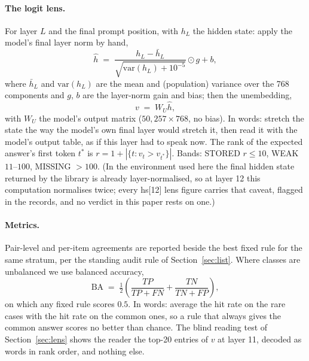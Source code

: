 \documentclass[11pt]{article}
\begin{document}
\paragraph{The logit lens.} For layer $L$ and the final prompt
position, with $h_L$ the hidden state: apply the model's final
layer norm by hand,
\begin{equation}
\hat{h} \;=\; \frac{h_L - \bar{h}_L}{\sqrt{\mathrm{var}(h_L) + 10^{-5}}}
\odot g + b,
\label{eq:lensnorm}
\end{equation}
where $\bar{h}_L$ and $\mathrm{var}(h_L)$ are the mean and
(population) variance over the 768 components and $g$, $b$ are the
layer-norm gain and bias; then the unembedding,
\begin{equation}
v \;=\; W_U \hat{h},
\label{eq:lens}
\end{equation}
with $W_U$ the model's output matrix ($50{,}257 \times 768$, no
bias). In words: stretch the state the way the model's own final
layer would stretch it, then read it with the model's output table,
as if this layer had to speak now. The rank of the expected answer's
first token $t^{*}$ is $r = 1 + |\{t : v_t > v_{t^{*}}\}|$. Bands:
STORED $r \le 10$, WEAK $11$--$100$, MISSING $> 100$. (In the
environment used here the final hidden state returned by the
library is already layer-normalised, so at layer 12 this
computation normalises twice; every hs[12] lens figure carries
that caveat, flagged in the records, and no verdict in this paper
rests on one.)

\paragraph{Metrics.} Pair-level and per-item agreements are
reported beside the best fixed rule for the same stratum, per the
standing audit rule of Section~\ref{sec:list}. Where classes are
unbalanced we use balanced accuracy,
\begin{equation}
\mathrm{BA} \;=\; \tfrac{1}{2}\left(\frac{TP}{TP + FN} +
\frac{TN}{TN + FP}\right),
\label{eq:ba}
\end{equation}
on which any fixed rule scores $0.5$. In words: average the hit
rate on the rare cases with the hit rate on the common ones, so a
rule that always gives the common answer scores no better than
chance.
The blind reading test of Section~\ref{sec:lens} shows the reader
the top-20 entries of $v$ at layer 11, decoded as words in rank
order, and nothing else.
\end{document}
